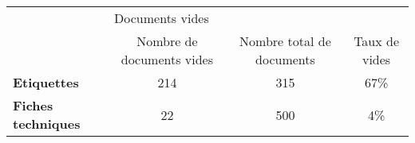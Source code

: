 \begin{tabular}{lccc}
\toprule
{} & \multicolumn{3}{l}{Documents vides} \\
{} & Nombre de documents vides & Nombre total de documents & Taux de vides \\
\midrule
\textbf{Etiquettes       } &                       214 &                       315 &           67\% \\
\textbf{Fiches techniques} &                        22 &                       500 &            4\% \\
\bottomrule
\end{tabular}
